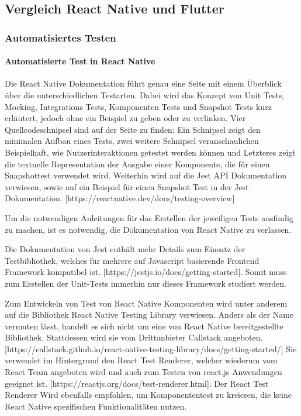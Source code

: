 
\subsection{Vergleich React Native und Flutter}

\subsubsection{Automatisiertes Testen}

\paragraph{Automatisierte Test in React Native} Die React Native Dokumentation führt genau eine Seite mit einem Überblick über die unterschiedlichen Testarten. Dabei wird das Konzept von Unit Tests, Mocking, Integrations Tests, Komponenten Tests und Snapshot Tests kurz erläutert, jedoch ohne ein Beispiel zu geben oder zu verlinken. Vier Quellcodeschnipsel sind auf der Seite zu finden: Ein Schnipsel zeigt den minimalen Aufbau eines Tests, zwei weitere Schnipsel veranschaulichen Beispielhaft, wie Nutzerinteraktionen getestet werden können und Letzteres zeigt die textuelle Representation der Ausgabe einer Komponente, die für einen Snapshottest verwendet wird. Weiterhin wird auf die Jest API Dokumentation verwiesen, sowie auf ein Beispiel für einen Snapshot Test in der Jest Dokumentation. [https://reactnative.dev/docs/testing-overview]

Um die notwendigen Anleitungen für das Erstellen der jeweiligen Tests ausfindig zu machen, ist es notwendig, die Dokumentation von React Native zu verlassen.

Die Dokumentation von Jest enthält mehr Details zum Einsatz der Testbibliothek, welches für mehrere auf Javascript basierende Frontend Framework kompatibel ist. [https://jestjs.io/docs/getting-started]. Somit muss zum Erstellen der Unit-Tests immerhin nur dieses Framework studiert werden.

Zum Entwickeln von Test von React Native Komponenten  wird unter anderem auf die Bibliothek React Native Testing Library verwiesen. Anders als der Name vermuten lässt, handelt es sich nicht um eine von React Native bereitgestellte Bibliothek. Stattdessen wird sie vom Drittanbieter Callstack angeboten. [https://callstack.github.io/react-native-testing-library/docs/getting-started/]
Sie verwendet im Hintergrund den React Test Renderer, welcher wiederum vom React Team angeboten wird und auch zum Testen von react.js Anwendungen geeignet ist. [https://reactjs.org/docs/test-renderer.html]. Der React Test Renderer Wird ebenfalls empfohlen, um Komponententest zu kreieren, die keine React Native spezifischen Funktionalitäten nutzen.


